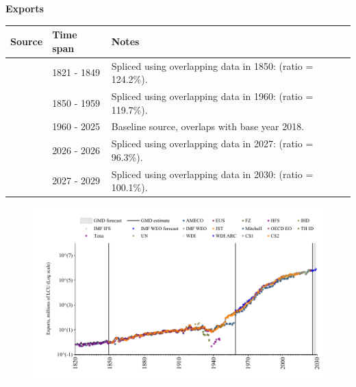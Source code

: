 \documentclass[12pt,a4paper,landscape]{article}
\begin{document}
\begin{adjustbox}{max totalsize={\paperwidth}{\paperheight},center}
\begin{minipage}[t][\textheight][t]{\textwidth}
\vspace*{0.5cm}
{}
\begin{center}
{\Large\bfseries Exports}
\end{center}
\vspace{0.5cm}
\begin{table}[H]
\centering
\small
\begin{tabular}{|l|l|l|}
\hline
\textbf{Source} & \textbf{Time span} & \textbf{Notes} \\
\hline
\rowcolor{white}\cite{Tena}& 1821 - 1849 &Spliced using overlapping data in 1850: (ratio = 124.2\%). \\
\rowcolor{lightgray}\cite{CS2_ESP}& 1850 - 1959 &Spliced using overlapping data in 1960: (ratio = 119.7\%). \\
\rowcolor{white}\cite{OECD_EO}& 1960 - 2025 &Baseline source, overlaps with base year 2018. \\
\rowcolor{lightgray}\cite{AMECO}& 2026 - 2026 &Spliced using overlapping data in 2027: (ratio = 96.3\%). \\
\rowcolor{white}\cite{IMF_WEO_forecast}& 2027 - 2029 &Spliced using overlapping data in 2030: (ratio = 100.1\%). \\
\hline
\end{tabular}
\end{table}
\begin{figure}[H]
\centering
\includegraphics[width=\textwidth,height=0.6\textheight,keepaspectratio]{graphs/ESP_exports.pdf}
\end{figure}
\end{minipage}
\end{adjustbox}
\end{document}
